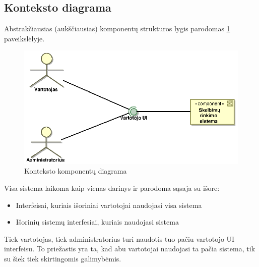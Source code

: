 \documentclass[12pt]{article}
\begin{document}
	\subsection{Konteksto diagrama}
	Abstrakčiausias (aukščiausias) komponentų struktūros lygis parodomas \ref{Components1} paveikslėlyje.
	\begin{figure}[h]
		\begin{center}
			\includegraphics[width=\textwidth]{Komponentai1.eps}
			\caption{Konteksto komponentų diagrama\label{Components1}}
		\end{center}
	\end{figure}
	
	 Visa sistema laikoma kaip vienas darinys ir parodoma sąsaja su išore:
	
	\begin{itemize}	
		\item Interfeisai, kuriais išoriniai vartotojai naudojasi visa sistema
		\item Išorinių sistemų interfesiai, kuriais naudojasi sistema
	\end{itemize}
	
	Tiek vartotojas, tiek administratorius turi naudotis tuo pačiu vartotojo UI interfeisu. To priežastis yra ta, kad abu vartotojai naudojasi ta pačia sistema, tik su šiek tiek skirtingomis galimybėmis.	
	\pagebreak
\end{document}
